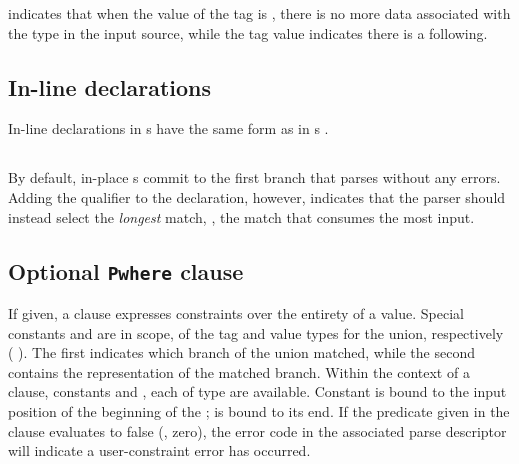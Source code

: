 
indicates that when the value of
the tag  is , there is no more data associated with
the type  in the input source, while the tag value 
indicates there is a  following.  





\subsection{In-line declarations}
\label{sec:unions-inline}
In-line declarations in \Punion{}s have the same form as in
\Pstruct{}s \cf{} .

\subsection{\Plongest{}}
By default, in-place \Punion{}s commit to the first branch that parses
without any errors. Adding the \Plongest{} qualifier to the
\Punion{} declaration, however, indicates that the parser should
instead select the \textit{longest} match, \ie{}, the match that
consumes the most input. 

\subsection{Optional \texttt{Pwhere} clause}
If given, a \Pwhere{} clause expresses constraints over the entirety
of a \Punion{} value.  Special constants  and  are
in scope, of the tag and value types for the union, respectively
(\cf{} ).  The
first indicates which branch of the union matched, while the second
contains the representation of the matched branch. 
Within the context of a 
\Pparsecheck{} clause, constants  and , each of type 
\Ppost{} are available.  Constant  is bound to the input
position of the beginning of the \punion{};  is bound to its end.
If the predicate given in
the \Pwhere{} clause evaluates to false (\ie{}, zero), the error code
in the associated parse descriptor will indicate a user-constraint
error has occurred.  

